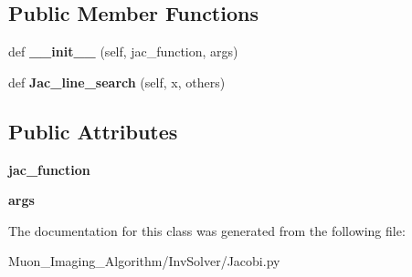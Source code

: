 \subsection*{Public Member Functions}
\begin{DoxyCompactItemize}
\item 
\mbox{\label{classMIS_1_1Muon__Imaging__Algorithm_1_1InvSolver_1_1Jacobi_1_1Jac__line__search_ad45a33efbffbd723b2fb917d67cb91cd}} 
def {\bfseries \+\_\+\+\_\+init\+\_\+\+\_\+} (self, jac\+\_\+function, args)
\item 
\mbox{\label{classMIS_1_1Muon__Imaging__Algorithm_1_1InvSolver_1_1Jacobi_1_1Jac__line__search_a17b956a77419e8bf35113aa7662bf913}} 
def {\bfseries Jac\+\_\+line\+\_\+search} (self, x, others)
\end{DoxyCompactItemize}
\subsection*{Public Attributes}
\begin{DoxyCompactItemize}
\item 
\mbox{\label{classMIS_1_1Muon__Imaging__Algorithm_1_1InvSolver_1_1Jacobi_1_1Jac__line__search_a78da5bf6f7983c16e93812478cf91011}} 
{\bfseries jac\+\_\+function}
\item 
\mbox{\label{classMIS_1_1Muon__Imaging__Algorithm_1_1InvSolver_1_1Jacobi_1_1Jac__line__search_a26ddd808739d42298c0b457801a7ad6d}} 
{\bfseries args}
\end{DoxyCompactItemize}


The documentation for this class was generated from the following file\+:\begin{DoxyCompactItemize}
\item 
Muon\+\_\+\+Imaging\+\_\+\+Algorithm/\+Inv\+Solver/Jacobi.\+py\end{DoxyCompactItemize}
